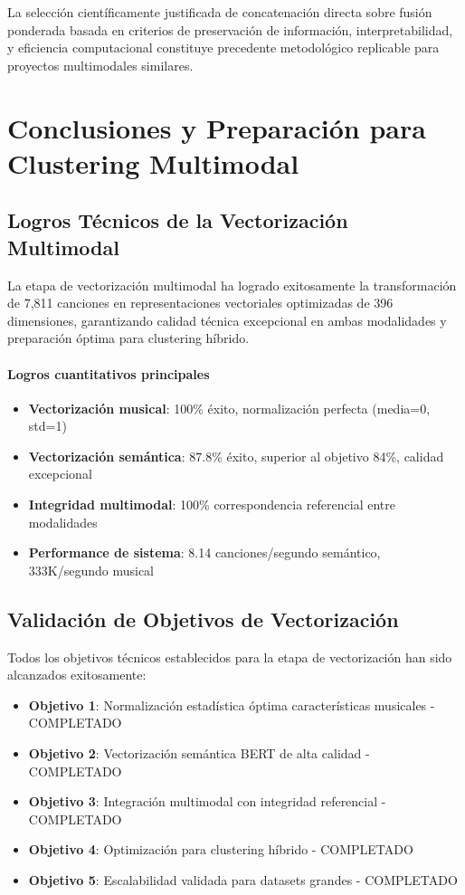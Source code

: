 \documentclass[12pt,a4paper]{article}
\begin{document}
La selección científicamente justificada de concatenación directa sobre fusión ponderada basada en criterios de preservación de información, interpretabilidad, y eficiencia computacional constituye precedente metodológico replicable para proyectos multimodales similares.

\section{Conclusiones y Preparación para Clustering Multimodal}

\subsection{Logros Técnicos de la Vectorización Multimodal}

La etapa de vectorización multimodal ha logrado exitosamente la transformación de 7,811 canciones en representaciones vectoriales optimizadas de 396 dimensiones, garantizando calidad técnica excepcional en ambas modalidades y preparación óptima para clustering híbrido.

\paragraph{Logros cuantitativos principales}
\begin{itemize}
    \item \textbf{Vectorización musical}: 100\% éxito, normalización perfecta (media=0, std=1)
    \item \textbf{Vectorización semántica}: 87.8\% éxito, superior al objetivo 84\%, calidad excepcional
    \item \textbf{Integridad multimodal}: 100\% correspondencia referencial entre modalidades
    \item \textbf{Performance de sistema}: 8.14 canciones/segundo semántico, 333K/segundo musical
\end{itemize}

\subsection{Validación de Objetivos de Vectorización}

Todos los objetivos técnicos establecidos para la etapa de vectorización han sido alcanzados exitosamente:

\begin{itemize}
    \item \checkmark \textbf{Objetivo 1}: Normalización estadística óptima características musicales - COMPLETADO
    \item \checkmark \textbf{Objetivo 2}: Vectorización semántica BERT de alta calidad - COMPLETADO
    \item \checkmark \textbf{Objetivo 3}: Integración multimodal con integridad referencial - COMPLETADO
    \item \checkmark \textbf{Objetivo 4}: Optimización para clustering híbrido - COMPLETADO
    \item \checkmark \textbf{Objetivo 5}: Escalabilidad validada para datasets grandes - COMPLETADO
\end{itemize}
\end{document}
